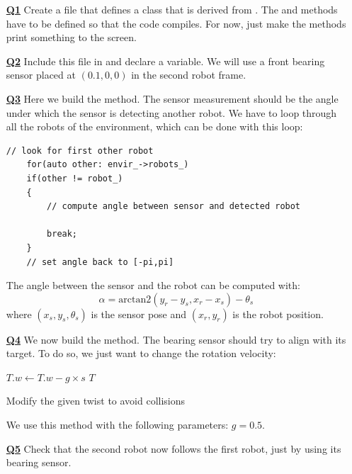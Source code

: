 \documentclass{ecnreport}
\begin{document}
\begin{itemize}
\medskip\item[\textbf{\underline{Q1}}] Create a  file that defines a  class that is derived from . The  and  methods have to be defined so that the code compiles. For now, just make the methods print something to the screen.

\medskip\item[\textbf{\underline{Q2}}] Include this file in  and declare a  variable.  We will use a front bearing sensor placed at $(0.1, 0,0)$ in the second robot frame.

\medskip\item[\textbf{\underline{Q3}}] Here we build the  method. The sensor measurement should be the angle under which the sensor is detecting another robot. 
We have to loop through all the robots of the environment, which can be done with this loop:
\begin{center}\cppstyle
\begin{lstlisting}
// look for first other robot
    for(auto other: envir_->robots_)
	if(other != robot_)
	{
	    // compute angle between sensor and detected robot
	    
	    break;
	}
    // set angle back to [-pi,pi]
\end{lstlisting}
\end{center}
The angle between the sensor and the robot can be computed with:
\begin{equation*}
 \alpha = \text{arctan2}(y_r - y_s, x_r-x_s) - \theta_s
\end{equation*}where $(x_s,y_s,\theta_s)$ is the sensor pose and $(x_r,y_r)$ is the robot position.

\medskip\item[\textbf{\underline{Q4}}] We now build the  method. The bearing sensor should try to align with its target. To do so, we just want to change the rotation velocity:
\begin{algorithm}[!h]
{}
$T.w \gets T.w - g\times s$\;
\Return $T$
\caption{Modify the given twist to avoid collisions}
\label{algo:bearing}
\end{algorithm}

We use this method with the following parameters: $g = 0.5$.


\medskip\item[\textbf{\underline{Q5}}] Check that the second robot now follows the first robot, just by using its bearing sensor. 

\end{itemize}
\end{document}
